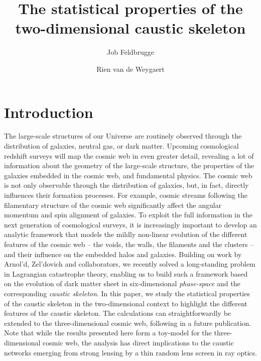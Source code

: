 \documentclass[a4paper, 11pt]{article}
\title{The statistical properties of the two-dimensional caustic skeleton}
\author[a,b]{Job Feldbrugge}
\author[c]{Rien van de Weygaert}
\affiliation[a]{Perimeter Institute for Theoretical Physics, University of Waterloo, Waterloo, Canada}
\affiliation[b]{Physics department, Carnegie Mellon University, Pittsburgh, United States}
\affiliation[c]{Kapteyn Astronomical Institute, University of Groningen, Groningen, The Netherlands}
\begin{document}
\maketitle

\section{Introduction}
The large-scale structures of our Universe are routinely observed through the distribution of galaxies, neutral gas, or dark matter. Upcoming cosmological redshift surveys will map the cosmic web in even greater detail, revealing a lot of information about the geometry of the large-scale structure, the properties of the galaxies embedded in the cosmic web, and fundamental physics. The cosmic web is not only observable through the distribution of galaxies, but, in fact, directly influences their formation processes. For example, cosmic streams following the filamentary structure of the cosmic web significantly affect the angular momentum and spin alignment of galaxies. To exploit the full information in the next generation of cosmological surveys, it is increasingly important to develop an analytic framework that models the mildly non-linear evolution of the different features of the cosmic web -- the voids, the walls, the filaments and the clusters -- and their influence on the embedded halos and galaxies. Building on work by Arnol'd, Zel'dovich and collaborators, we recently solved a long-standing problem in Lagrangian catastrophe theory, enabling us to build such a framework based on the evolution of dark matter sheet in six-dimensional \textit{phase-space} and the corresponding \textit{caustic skeleton}. In this paper, we study the statistical properties of the caustic skeleton in the two-dimensional context to highlight the different features of the caustic skeleton. The calculations can straightforwardly be extended to the three-dimensional cosmic web, following in a future publication. Note that while the results presented here form a toy-model for the three-dimensional cosmic web, the analysis has direct implications to the caustic networks emerging from strong lensing by a thin random lens screen in ray optics.
\end{document}

